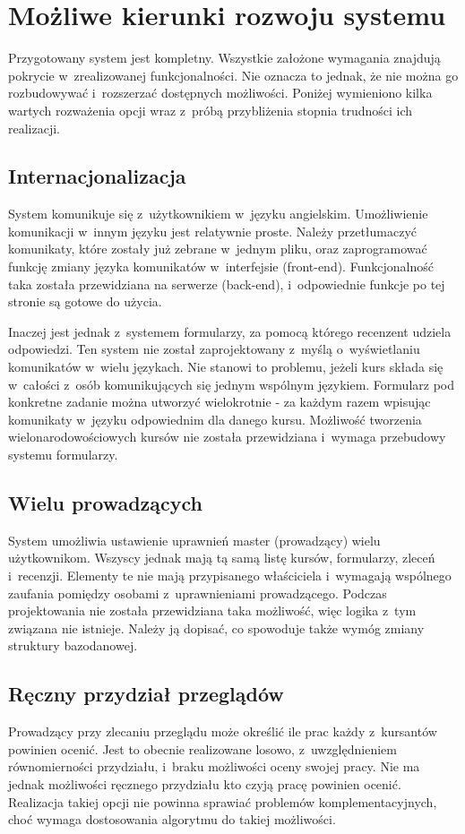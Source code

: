 \chapter{Możliwe kierunki rozwoju systemu}

Przygotowany system jest kompletny. Wszystkie założone wymagania znajdują pokrycie w~zrealizowanej funkcjonalności. Nie oznacza to jednak, że nie można go rozbudowywać i~rozszerzać dostępnych możliwości. Poniżej wymieniono kilka wartych rozważenia opcji wraz z~próbą przybliżenia stopnia trudności ich realizacji. 

\section{Internacjonalizacja}
System komunikuje się z~użytkownikiem w~języku angielskim. Umożliwienie komunikacji w~innym języku jest relatywnie proste. Należy przetłumaczyć komunikaty, które zostały już zebrane w~jednym pliku, oraz zaprogramować funkcję zmiany języka komunikatów w~interfejsie (front-end). Funkcjonalność taka została przewidziana na serwerze (back-end), i~odpowiednie funkcje po tej stronie są gotowe do użycia.

\medskip
Inaczej jest jednak z~systemem formularzy, za pomocą którego recenzent udziela odpowiedzi. Ten system nie został zaprojektowany z~myślą o~wyświetlaniu komunikatów w~wielu językach. Nie stanowi to problemu, jeżeli kurs składa się w~całości z~osób komunikujących się jednym wspólnym językiem. Formularz pod konkretne zadanie można utworzyć wielokrotnie - za każdym razem wpisując komunikaty w~języku odpowiednim dla danego kursu. Możliwość tworzenia wielonarodowościowych kursów nie została przewidziana i~wymaga przebudowy systemu formularzy.

\section{Wielu prowadzących}
System umożliwia ustawienie uprawnień master (prowadzący) wielu użytkownikom. Wszyscy jednak mają tą samą listę kursów, formularzy,  zleceń i~recenzji. Elementy te nie mają przypisanego właściciela i~wymagają wspólnego zaufania pomiędzy osobami z~uprawnieniami prowadzącego. Podczas projektowania nie została przewidziana taka możliwość, więc logika z~tym związana nie istnieje. Należy ją dopisać, co spowoduje także wymóg zmiany struktury bazodanowej. 

\section{Ręczny przydział przeglądów}
Prowadzący przy zlecaniu przeglądu może określić ile prac każdy z~kursantów powinien ocenić. Jest to obecnie realizowane losowo, z~uwzględnieniem równomierności przydziału, i~braku możliwości oceny swojej pracy. Nie ma jednak możliwości ręcznego przydziału kto czyją pracę powinien ocenić. Realizacja takiej opcji nie powinna sprawiać problemów komplementacyjnych, choć wymaga dostosowania algorytmu do takiej możliwości.


